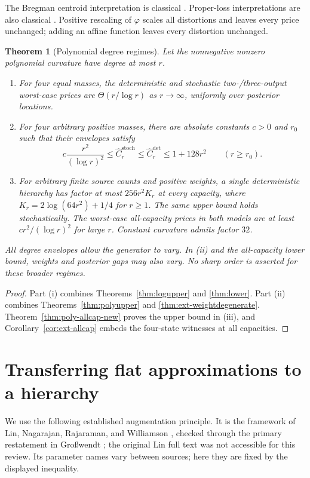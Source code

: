 \documentclass[11pt]{article}
\newtheorem{theorem}{Theorem}[section]
\theoremstyle{definition}\newtheorem{definition}[theorem]{Definition}
\theoremstyle{remark}\newtheorem{remark}[theorem]{Remark}
\newcommand{\ph}{\varphi}
\newcommand{\detp}{\mathrm{det}}
\newcommand{\stp}{\mathrm{stoch}}
\begin{document}
The Bregman centroid interpretation is classical \cite{banerjee}. Proper-loss interpretations are also classical \cite{gneiting,reid}. Positive rescaling of $\ph$ scales all distortions and leaves every price unchanged; adding an affine function leaves every distortion unchanged.

\begin{theorem}[Polynomial degree regimes]
\label{thm:main}
Let the nonnegative nonzero polynomial curvature have degree at most $r$.
\begin{enumerate}[label=(\roman*),leftmargin=*]
\item For four equal masses, the deterministic and stochastic two-/three-output worst-case prices are $\Theta(r/\log r)$ as $r\to\infty$, uniformly over posterior locations.
\item For four arbitrary positive masses, there are absolute constants $c>0$ and $r_0$ such that their envelopes satisfy
\[
c\frac{r^2}{(\log r)^2}\le\widehat C_r^{\stp}
\le\widehat C_r^{\detp}\le1+128r^2\qquad(r\ge r_0).
\]
\item For arbitrary finite source counts and positive weights, a single deterministic hierarchy has factor at most $256r^2K_r$ at every capacity, where $K_r=2\log(64r^2)+1/4$ for $r\ge1$. The same upper bound holds stochastically. The worst-case all-capacity prices in both models are at least $cr^2/(\log r)^2$ for large $r$. Constant curvature admits factor $32$.
\end{enumerate}
All degree envelopes allow the generator to vary. In (ii) and the all-capacity lower bound, weights and posterior gaps may also vary. No sharp order is asserted for these broader regimes.
\end{theorem}
\begin{proof}
Part (i) combines Theorems~\ref{thm:logupper} and \ref{thm:lower}.
Part (ii) combines Theorems~\ref{thm:polyupper} and \ref{thm:ext-weightdegenerate}.
Theorem~\ref{thm:poly-allcap-new} proves the upper bound in (iii), and Corollary~\ref{cor:ext-allcap} embeds the four-state witnesses at all capacities.
\end{proof}

\section{Transferring flat approximations to a hierarchy}
\label{sec:transfer}
We use the following established augmentation principle. It is the framework of Lin, Nagarajan, Rajaraman, and Williamson \cite{lin}, checked through the primary restatement in Gro\ss wendt \cite[Theorem 2.11, p.~29]{grosswendt}; the original Lin full text was not accessible for this review. Its parameter names vary between sources; here they are fixed by the displayed inequality.
\end{document}
